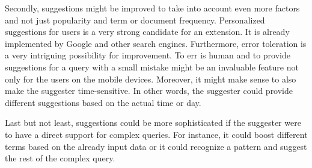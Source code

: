 Secondly, suggestions might be improved to take into account even more factors and not just popularity and term or document frequency.
Personalized suggestions for users is a very strong candidate for an extension. It is already implemented by Google and
other search engines. Furthermore, error toleration is a very intriguing possibility for improvement. To err is human and
to provide suggestions for a query with a small mistake might be an invaluable feature not only for the users on the mobile devices.
Moreover, it might make sense to also make the suggester time-sensitive. In other words, the suggester could provide
different suggestions based on the actual time or day.

Last but not least, suggestions could be more sophisticated if the suggester were to have a direct support for complex queries.
For instance, it could boost different terms based on the already input data or it could recognize a pattern and suggest
the rest of the complex query.
